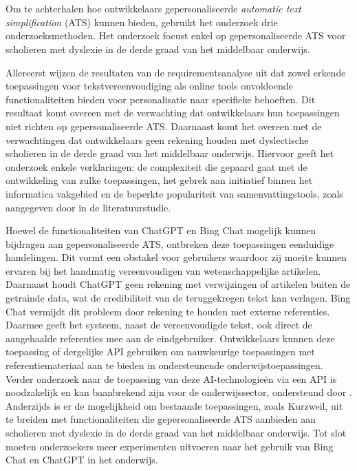 
\chapter{}%
\label{ch:discussie}

Om te achterhalen hoe ontwikkelaars gepersonaliseerde \textit{automatic text simplification} (ATS) kunnen bieden, gebruikt het onderzoek drie onderzoeksmethoden. Het onderzoek focust enkel op gepersonaliseerde ATS voor scholieren met dyslexie in de derde graad van het middelbaar onderwijs.

\medspace

Allereerst wijzen de resultaten van de requirementsanalyse uit dat zowel erkende toepassingen voor tekstvereenvoudiging als online tools onvoldoende functionaliteiten bieden voor personalisatie naar specifieke behoeften. Dit resultaat komt overeen met de verwachting dat ontwikkelaars hun toepassingen niet richten op gepersonaliseerde ATS. Daarnaast komt het overeen met de verwachtingen dat ontwikkelaars geen rekening houden met dyslectische scholieren in de derde graad van het middelbaar onderwijs. Hiervoor geeft het onderzoek enkele verklaringen: de complexiteit die gepaard gaat met de ontwikkeling van zulke toepassingen, het gebrek aan initiatief binnen het informatica vakgebied en de beperkte populariteit van samenvattingstools, zoals aangegeven door \textcite{Gooding2022} in de literatuurstudie.

\medspace

Hoewel de functionaliteiten van ChatGPT en Bing Chat mogelijk kunnen bijdragen aan gepersonaliseerde ATS, ontbreken deze toepassingen eenduidige handelingen. Dit vormt een obstakel voor gebruikers waardoor zij moeite kunnen ervaren bij het handmatig vereenvoudigen van wetenschappelijke artikelen. Daarnaast houdt ChatGPT geen rekening met verwijzingen of artikelen buiten de getrainde data, wat de credibiliteit van de teruggekregen tekst kan verlagen. Bing Chat vermijdt dit probleem door rekening te houden met externe referenties. Daarmee geeft het systeem, naast de vereenvoudigde tekst, ook direct de aangehaalde referenties mee aan de eindgebruiker. Ontwikkelaars kunnen deze toepassing of dergelijke API gebruiken om nauwkeurige toepassingen met referentiemateriaal aan te bieden in ondersteunende onderwijstoepassingen. Verder onderzoek naar de toepassing van deze AI-technologieën via een API is noodzakelijk en kan baanbrekend zijn voor de onderwijssector, ondersteund door \textcite{Roose2023, Garg2022}. Anderzijds is er de mogelijkheid om bestaande toepassingen, zoals Kurzweil, uit te breiden met functionaliteiten die gepersonaliseerde ATS aanbieden aan scholieren met dyslexie in de derde graad van het middelbaar onderwijs. Tot slot moeten onderzoekers meer experimenten uitvoeren naar het gebruik van Bing Chat en ChatGPT in het onderwijs. 

